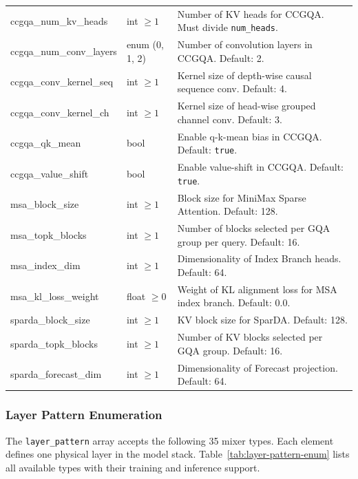 \begin{longtable}{>{\ttfamily}l>{\raggedright\arraybackslash}p{3.5cm}>{\raggedright\arraybackslash}p{8.5cm}}
ccgqa\_num\_kv\_heads & int $\ge 1$ & Number of KV heads for CCGQA. Must divide \texttt{num\_heads}. \\
ccgqa\_num\_conv\_layers & enum (0, 1, 2) & Number of convolution layers in CCGQA. Default: 2. \\
ccgqa\_conv\_kernel\_seq & int $\ge 1$ & Kernel size of depth-wise causal sequence conv. Default: 4. \\
ccgqa\_conv\_kernel\_ch & int $\ge 1$ & Kernel size of head-wise grouped channel conv. Default: 3. \\
ccgqa\_qk\_mean & bool & Enable q-k-mean bias in CCGQA. Default: \texttt{true}. \\
ccgqa\_value\_shift & bool & Enable value-shift in CCGQA. Default: \texttt{true}. \\
msa\_block\_size & int $\ge 1$ & Block size for MiniMax Sparse Attention. Default: 128. \\
msa\_topk\_blocks & int $\ge 1$ & Number of blocks selected per GQA group per query. Default: 16. \\
msa\_index\_dim & int $\ge 1$ & Dimensionality of Index Branch heads. Default: 64. \\
msa\_kl\_loss\_weight & float $\ge 0$ & Weight of KL alignment loss for MSA index branch. Default: 0.0. \\
sparda\_block\_size & int $\ge 1$ & KV block size for SparDA. Default: 128. \\
sparda\_topk\_blocks & int $\ge 1$ & Number of KV blocks selected per GQA group. Default: 16. \\
sparda\_forecast\_dim & int $\ge 1$ & Dimensionality of Forecast projection. Default: 64. \\
\end{longtable}

\subsubsection{Layer Pattern Enumeration}
\label{tab:layer-pattern}

The \texttt{layer\_pattern} array accepts the following 35 mixer types. Each element defines one physical layer in the model stack. Table~\ref{tab:layer-pattern-enum} lists all available types with their training and inference support.

